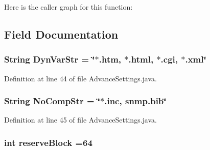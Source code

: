 Here is the caller graph for this function\+:




\subsection{Field Documentation}
\hypertarget{class_microchip_m_p_f_s_1_1_advance_settings_a5678caea3328c6053c17bbf2cde70e52}{}
\subsubsection[{Dyn\+Var\+Str}]{\setlength{\rightskip}{0pt plus 5cm}String Dyn\+Var\+Str = \char`\"{}$\ast$.htm, $\ast$.html, $\ast$.cgi, $\ast$.xml\char`\"{}}\label{class_microchip_m_p_f_s_1_1_advance_settings_a5678caea3328c6053c17bbf2cde70e52}


Definition at line 44 of file Advance\+Settings.\+java.

\hypertarget{class_microchip_m_p_f_s_1_1_advance_settings_a565edbbd403daa2dba38f7382d372d37}{}
\subsubsection[{No\+Comp\+Str}]{\setlength{\rightskip}{0pt plus 5cm}String No\+Comp\+Str = \char`\"{}$\ast$.inc, snmp.\+bib\char`\"{}}\label{class_microchip_m_p_f_s_1_1_advance_settings_a565edbbd403daa2dba38f7382d372d37}


Definition at line 45 of file Advance\+Settings.\+java.

\hypertarget{class_microchip_m_p_f_s_1_1_advance_settings_af02585e952b32afd48b049ca223cc360}{}
\subsubsection[{reserve\+Block}]{\setlength{\rightskip}{0pt plus 5cm}int reserve\+Block =64}\label{class_microchip_m_p_f_s_1_1_advance_settings_af02585e952b32afd48b049ca223cc360}


